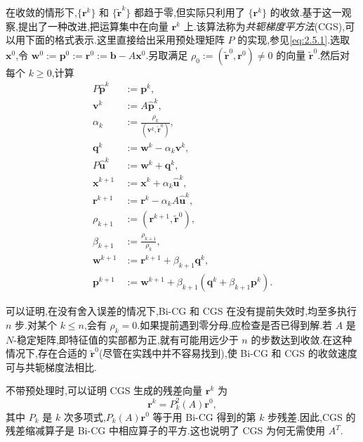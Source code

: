 在收敛的情形下,\(\{\boldsymbol{r}^k\}\) 和 \(\{\widetilde{\boldsymbol{r}}^k\}\) 都趋于零,但实际只利用了 \(\{\boldsymbol{r}^k\}\) 的收敛.基于这一观察,提出了一种改进,把运算集中在向量 \(\boldsymbol{r}^k\) 上.该算法称为\emph{共轭梯度平方法}(CGS),可以用下面的格式表示.这里直接给出采用预处理矩阵 \(P\) 的实现,参见\eqref{eq:2.5.1}.选取 \(\boldsymbol{x}^0\),令 \(\boldsymbol{w}^0:=\boldsymbol{p}^0:=\boldsymbol{r}^0:=\boldsymbol{b}-A\boldsymbol{x}^0\).另取满足 \(\rho_0:=(\widetilde{\boldsymbol{r}}^0,\boldsymbol{r}^0)\ne0\) 的向量 \(\widetilde{\boldsymbol{r}}^0\).然后对每个 \(k\ge0\),计算
\begin{align}
  P\widehat{\boldsymbol{p}}^k&:=\boldsymbol{p}^k,\label{eq:2.6.31}\\
  \boldsymbol{v}^k&:=A\widehat{\boldsymbol{p}}^k,\label{eq:2.6.32}\\
  \alpha_k&:=\frac{\rho_k}{(\boldsymbol{v}^k,\widetilde{\boldsymbol{r}}^0)},\label{eq:2.6.33}\\
  \boldsymbol{q}^k&:=\boldsymbol{w}^k-\alpha_k\boldsymbol{v}^k,\label{eq:2.6.34}\\
  P\widehat{\boldsymbol{u}}^k&:=\boldsymbol{w}^k+\boldsymbol{q}^k,\label{eq:2.6.35}\\
  \boldsymbol{x}^{k+1}&:=\boldsymbol{x}^k+\alpha_k\widehat{\boldsymbol{u}}^k,\label{eq:2.6.36}\\
  \boldsymbol{r}^{k+1}&:=\boldsymbol{r}^k-\alpha_k A\widehat{\boldsymbol{u}}^k,\label{eq:2.6.37}\\
  \rho_{k+1}&:=(\boldsymbol{r}^{k+1},\widetilde{\boldsymbol{r}}^0),\label{eq:2.6.38}\\
  \beta_{k+1}&:=\frac{\rho_{k+1}}{\rho_k},\label{eq:2.6.39}\\
  \boldsymbol{w}^{k+1}&:=\boldsymbol{r}^{k+1}+\beta_{k+1}\boldsymbol{q}^k,\label{eq:2.6.40}\\
  \boldsymbol{p}^{k+1}&:=\boldsymbol{w}^{k+1}+\beta_{k+1}(\boldsymbol{q}^k+\beta_{k+1}\boldsymbol{p}^k).\label{eq:2.6.41}
\end{align}

可以证明,在没有舍入误差的情况下,Bi-CG 和 CGS 在没有提前失效时,均至多执行 \(n\) 步.对某个 \(k\le n\),会有 \(\rho_k=0\).如果提前遇到零分母,应检查是否已得到解.若 \(A\) 是 \(N\)-稳定矩阵,即特征值的实部都为正,就有可能用远少于 \(n\) 的步数达到收敛.在这种情况下,存在合适的 \(\widetilde{\boldsymbol{r}}^0\)(尽管在实践中并不容易找到),使 Bi-CG 和 CGS 的收敛速度可与共轭梯度法相比.

不带预处理时,可以证明 CGS 生成的残差向量 \(\boldsymbol{r}^k\) 为
\[
  \boldsymbol{r}^k=P_k^2(A)\boldsymbol{r}^0,
\]
其中 \(P_k\) 是 \(k\) 次多项式,\(P_k(A)\boldsymbol{r}^0\) 等于用 Bi-CG 得到的第 \(k\) 步残差.因此,CGS 的残差缩减算子是 Bi-CG 中相应算子的平方.这也说明了 CGS 为何无需使用 \(A^T\).

